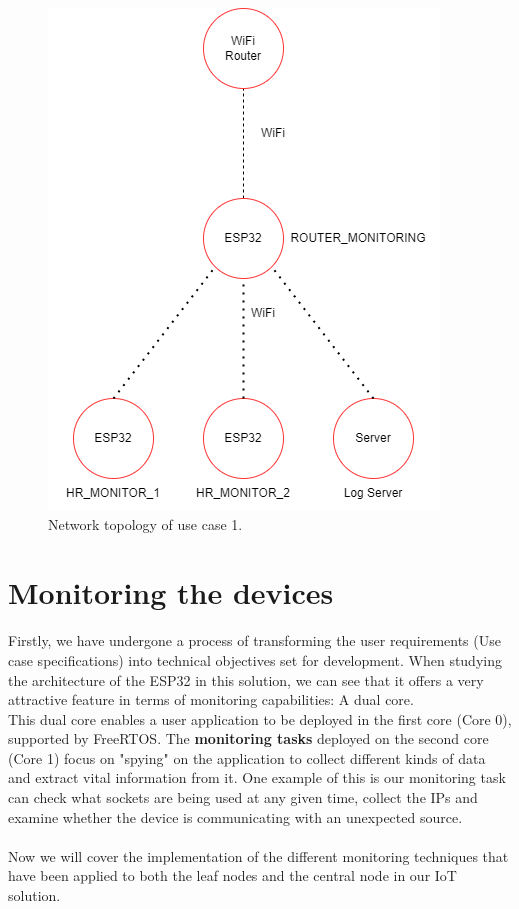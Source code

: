 \begin{figure}[h]
    \centering
    \includegraphics[scale=0.5]{images/uc_topology.png}
    \caption{Network topology of use case 1.}
    \label{fig:uc1}
\end{figure}


\section{Monitoring the devices}
Firstly, we have undergone a process of transforming the user requirements (Use case specifications) into technical objectives set for development. When studying the architecture of the ESP32 in this solution, we can see that it offers a very attractive feature in terms of monitoring capabilities: A dual core.\\ 

This dual core enables a user application to be deployed in the first core (Core 0), supported by FreeRTOS. The \textbf{monitoring tasks} deployed on the second core (Core 1) focus on "spying" on the application to collect different kinds of data and extract vital information from it. One example of this is our monitoring task can check what sockets are being used at any given time, collect the IPs and examine whether the device is communicating with an unexpected source.
\\~\\
Now we will cover the implementation of the different monitoring techniques that have been applied to both the leaf nodes and the central node in our IoT solution.


